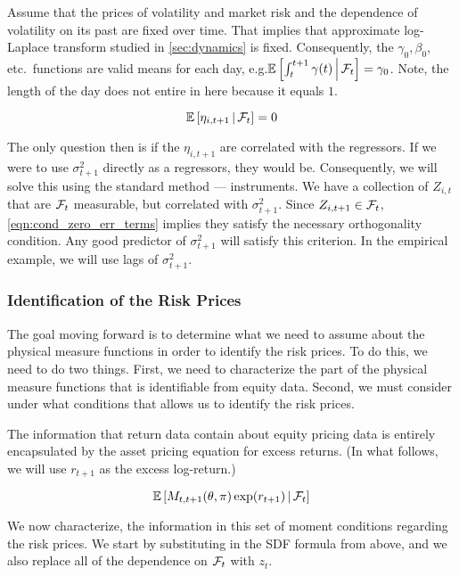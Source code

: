 \documentclass[11pt, letterpaper, twoside, final]{article}
\begin{document}
Assume that the prices of volatility and market risk and the dependence of volatility on its past are fixed over
time.
That implies that approximate log-Laplace transform studied in \cref{sec:dynamics} is fixed.
Consequently, the $\gamma_0, \beta_0$, etc.\ functions are valid means for each day, e.g.\@ $\operatorname{\mathbb{E}}\left[\int_t^{t+1}
\gamma(t) \,\middle\vert\, \mathcal{F}_t \right] = \gamma_0$. 
Note, the length of the day does not entire in here because it equals $1$.

\begin{equation}
    \label{eqn:cond_zero_err_terms}
    \operatorname{\mathbb{E}}\left[\eta_{i,t+1} \,\middle\vert\, \mathcal{F}_{t}\right] = 0
\end{equation}

The only question then is if the $\eta_{i,t+1}$ are correlated with the regressors. 
If we were to use $\sigma^2_{t+1}$ directly as a regressors, they would be.
Consequently, we will solve this using the standard method --- instruments.
We have a collection of $Z_{i,t}$ that are $\mathcal{F}_t$ measurable, but correlated with $\sigma^2_{t+1}$.
Since $Z_{i,t+1} \in \mathcal{F}_t$, \cref{eqn:cond_zero_err_terms} implies they satisfy the necessary orthogonality
condition. 
Any good predictor of $\sigma^2_{t+1}$ will satisfy this criterion.
In the empirical example, we will use lags of $\sigma^2_{t+1}$.


\subsubsection{Identification of the Risk Prices}


The goal moving forward is to determine what we need to assume about the physical measure functions in order to
identify the risk prices.
To do this, we need to do two things.
First, we need to characterize the part of the physical measure functions that is identifiable from equity data.
Second, we must consider under what conditions that allows us to identify the risk prices. 

The information that return data contain about equity pricing data is entirely encapsulated by the asset pricing
equation for excess returns.  
(In what follows, we will use $r_{t+1}$ as the excess log-return.)

\begin{equation}
    \operatorname{\mathbb{E}}\left[ M_{t,t+1}(\theta, \pi) \exp(r_{t+1}) \,\middle\vert\, \mathcal{F}_{t} \right]
\end{equation}

We now characterize, the information in this set of moment conditions regarding the risk prices.
We start by substituting in the SDF formula from above, and we also replace all of the dependence on $\mathcal{F}_t$ with
$z_t$.
\end{document}
